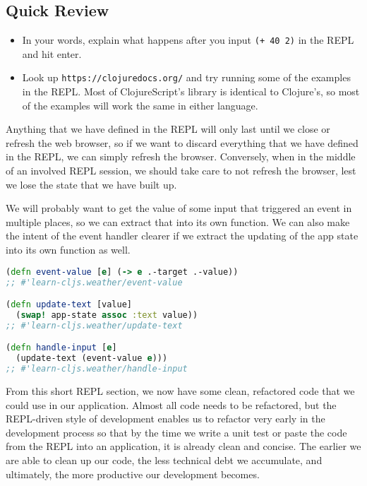 \documentclass[10pt,twoside,openright]{memoir}
\begin{document}
\subsection{Quick Review}

\begin{itemize}
\tightlist
\item
  In your words, explain what happens after you input
  \texttt{(+\ 40\ 2)} in the REPL and hit enter.
\item
  Look up \texttt{https://clojuredocs.org/} and try running some of the
  examples in the REPL. Most of ClojureScript's library is identical to
  Clojure's, so most of the examples will work the same in either
  language.
\end{itemize}

\begin{notice}[title={Important}]
Anything that we have defined in the REPL will only last until we close
or refresh the web browser, so if we want to discard everything that we
have defined in the REPL, we can simply refresh the browser. Conversely,
when in the middle of an involved REPL session, we should take care to
not refresh the browser, lest we lose the state that we have built up.
\end{notice}

We will probably want to get the value of some input that triggered an
event in multiple places, so we can extract that into its own function.
We can also make the intent of the event handler clearer if we extract
the updating of the app state into its own function as well.

\begin{lstlisting}[language=Clojure, caption={Refactored code}]
(defn event-value [e] (-> e .-target .-value))
;; #'learn-cljs.weather/event-value

(defn update-text [value]
  (swap! app-state assoc :text value))
;; #'learn-cljs.weather/update-text

(defn handle-input [e]
  (update-text (event-value e)))
;; #'learn-cljs.weather/handle-input
\end{lstlisting}

From this short REPL section, we now have some clean, refactored code
that we could use in our application. Almost all code needs to be
refactored, but the REPL-driven style of development enables us to
refactor very early in the development process so that by the time we
write a unit test or paste the code from the REPL into an application,
it is already clean and concise. The earlier we are able to clean up our
code, the less technical debt we accumulate, and ultimately, the more
productive our development becomes.
\end{document}

